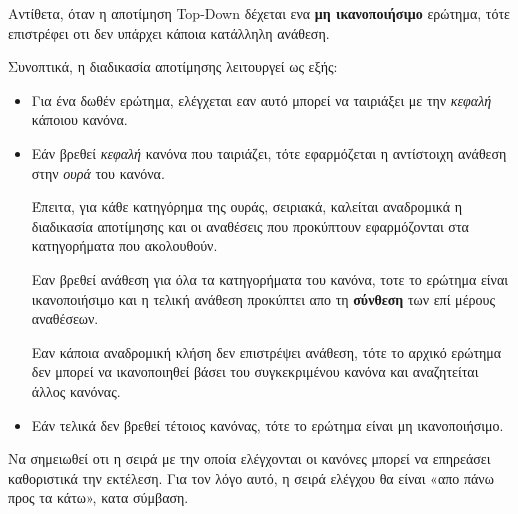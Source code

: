 \documentclass[10pt]{article}
\begin{document}
Αντίθετα, όταν η αποτίμηση Top-Down δέχεται ενα \textbf{μη ικανοποιήσιμο} ερώτημα, τότε επιστρέφει οτι δεν υπάρχει κάποια κατάλληλη ανάθεση.\

Συνοπτικά, η διαδικασία αποτίμησης λειτουργεί ως εξής:\

\begin{itemize}
    \item Για ένα δωθέν ερώτημα, ελέγχεται εαν αυτό μπορεί να ταιριάξει με την \textit{κεφαλή} κάποιου κανόνα.\
    \item Εάν βρεθεί \textit{κεφαλή} κανόνα που ταιριάζει, τότε εφαρμόζεται η αντίστοιχη ανάθεση στην \textit{ουρά} του κανόνα.\

    Έπειτα, για κάθε κατηγόρημα της ουράς, σειριακά, καλείται αναδρομικά η διαδικασία αποτίμησης και οι αναθέσεις που προκύπτουν εφαρμόζονται στα κατηγορήματα που ακολουθούν.\

    Εαν βρεθεί ανάθεση για όλα τα κατηγορήματα του κανόνα, τοτε το ερώτημα είναι ικανοποιήσιμο και η τελική ανάθεση προκύπτει απο τη \textbf{σύνθεση} των επί μέρους αναθέσεων.

    Εαν κάποια αναδρομική κλήση δεν επιστρέψει ανάθεση, τότε το αρχικό ερώτημα δεν μπορεί να ικανοποιηθεί βάσει του συγκεκριμένου κανόνα και αναζητείται άλλος κανόνας.\

    \item Εάν τελικά δεν βρεθεί τέτοιος κανόνας, τότε το ερώτημα είναι μη ικανοποιήσιμο. 

\end{itemize}

Να σημειωθεί οτι η σειρά με την οποία ελέγχονται οι κανόνες μπορεί να επηρεάσει καθοριστικά την εκτέλεση. Για τον λόγο αυτό, η σειρά ελέγχου θα είναι «απο πάνω προς τα κάτω», κατα σύμβαση. 







\end{document}
